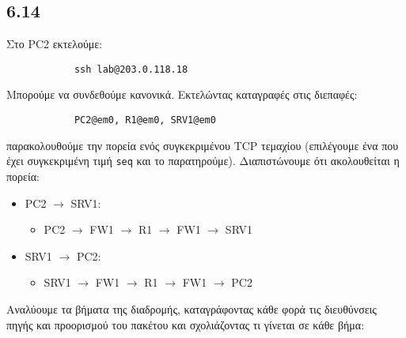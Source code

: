 \documentclass[a4paper, 12pt]{article}
\begin{document}
	\subsection*{6.14}
		Στο PC2 εκτελούμε:
		
		\begin{verbatim}
			ssh lab@203.0.118.18
		\end{verbatim}
		
		Μπορούμε να συνδεθούμε κανονικά. Εκτελώντας καταγραφές στις διεπαφές:
		
		\begin{verbatim}
			PC2@em0, R1@em0, SRV1@em0
		\end{verbatim}
		
		παρακολουθούμε την πορεία ενός συγκεκριμένου TCP τεμαχίου (επιλέγουμε ένα που έχει συγκεκριμένη τιμή \verb|seq| και το παρατηρούμε). Διαπιστώνουμε ότι ακολουθείται η πορεία:
		
		\begin{itemize}
			\item PC2 $\rightarrow$ SRV1:
				\begin{itemize}
					\item PC2 $\rightarrow$ FW1 $\rightarrow$ R1 $\rightarrow$ FW1 $\rightarrow$ SRV1
				\end{itemize} 
				 
			\item SRV1 $\rightarrow$ PC2:
				\begin{itemize}
					\item SRV1 $\rightarrow$ FW1 $\rightarrow$ R1 $\rightarrow$ FW1 $\rightarrow$ PC2 
				\end{itemize} 
		\end{itemize}

		Αναλύουμε τα βήματα της διαδρομής, καταγράφοντας κάθε φορά τις διευθύνσεις πηγής και προορισμού του πακέτου και σχολιάζοντας τι γίνεται σε κάθε βήμα:
		
\end{document}
